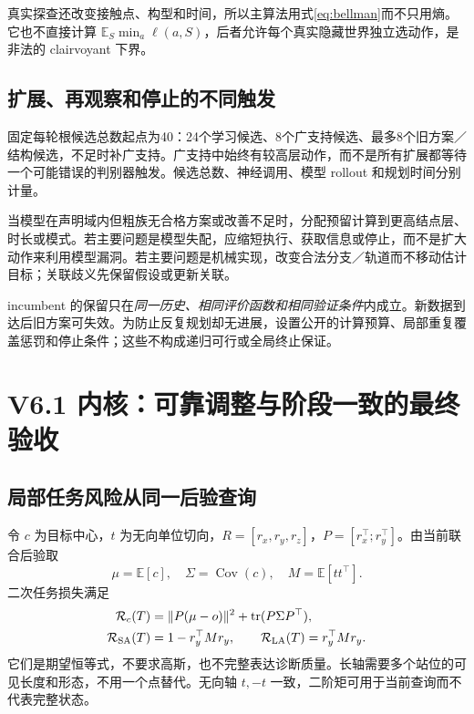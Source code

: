 \documentclass[UTF8,fontset=fandol,11pt,a4paper]{ctexart}
\theoremstyle{plain}
\theoremstyle{definition}
\theoremstyle{remark}
\numberwithin{equation}{section}
\newcommand{\E}{\mathbb E}
\DeclareMathOperator{\tr}{tr}
\DeclareMathOperator{\Cov}{Cov}
\begin{document}
真实探查还改变接触点、构型和时间，所以主算法用式\eqref{eq:bellman}而不只用熵。它也不直接计算 $\E_S\min_a\ell(a,S)$，后者允许每个真实隐藏世界独立选动作，是非法的 clairvoyant 下界。

\subsection{扩展、再观察和停止的不同触发}
固定每轮根候选总数起点为40：24个学习候选、8个广支持候选、最多8个旧方案／结构候选，不足时补广支持。广支持中始终有较高层动作，而不是所有扩展都等待一个可能错误的判别器触发。候选总数、神经调用、模型 rollout 和规划时间分别计量。

当模型在声明域内但粗族无合格方案或改善不足时，分配预留计算到更高结点层、时长或模式。若主要问题是模型失配，应缩短执行、获取信息或停止，而不是扩大动作来利用模型漏洞。若主要问题是机械实现，改变合法分支／轨道而不移动估计目标；关联歧义先保留假设或更新关联。

incumbent 的保留只在\emph{同一历史、相同评价函数和相同验证条件}内成立。新数据到达后旧方案可失效。为防止反复规划却无进展，设置公开的计算预算、局部重复覆盖惩罚和停止条件；这些不构成递归可行或全局终止保证。

\section{V6.1 内核：可靠调整与阶段一致的最终验收}
\label{sec:risk}
\subsection{局部任务风险从同一后验查询}
令 $c$ 为目标中心，$t$ 为无向单位切向，$R=[r_x,r_y,r_z]$，$P=[r_x^\top;r_y^\top]$。由当前联合后验取
\begin{equation}
\mu=\E[c],\quad\Sigma=\Cov(c),\quad M=\E[tt^\top].
\end{equation}
二次任务损失满足
\begin{align}
\mathcal R_c(T)&=\|P(\mu-o)\|^2+\tr(P\Sigma P^\top),\\
\mathcal R_{\rm SA}(T)&=1-r_y^\top Mr_y,\qquad
\mathcal R_{\rm LA}(T)=r_y^\top Mr_y.
\label{eq:moments}
\end{align}
它们是期望恒等式，不要求高斯，也不完整表达诊断质量。长轴需要多个站位的可见长度和形态，不用一个点替代。无向轴 $t,-t$ 一致，二阶矩可用于当前查询而不代表完整状态。
\end{document}
